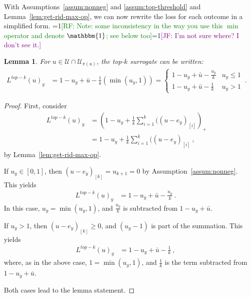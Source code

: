 \documentclass[12pt]{article}
\newcommand{\Comments}{1}
\newcommand{\mynote}[2]{\ifnum\Comments=1\textcolor{#1}{#2}\fi}
\newcommand{\raf}[1]{\mynote{green}{[RF: #1]}}
\newcommand{\jessie}[1]{\mynote{purple}{[JF: #1]}}
\newcommand{\ubar}{\bar{u}}
\newcommand{\U}{\mathcal{U}}
\newcommand{\ones}{\mathbbm{1}}
\newtheorem{lemma}{Lemma}
\begin{document}
With Assumptions~\ref{assum:nonneg} and \ref{assum:top-threshold} and Lemma~\ref{lem:get-rid-max-op}, we can now rewrite the loss for each outcome in a simplified form.
\raf{Note: some inconsistency in the way you use this $\min$ operator and denote $\ones$; see below too}\jessie{I'm not sure where?  I don't see it.}
\begin{lemma}\label{lem:new-form-surrogate}
	For $u \in \U \cap \U_{\pi(u)}$, the top-$k$ surrogate can be written:
\begin{align*} 
L^{top-k}(u)_y  &= 1 - u_y + \bar u - \frac{1}{k}(\min(u_y, 1)) = \begin{cases}
1 - u_y + \bar u - \frac{u_y}{k} & u_y \leq 1\\
1 - u_y + \bar u - \frac{1}{k} & u_y > 1
\end{cases}
~.~
\end{align*}
\end{lemma}
\begin{proof}
	First, consider
\begin{align*}
	L^{top-k}(u)_y &= \left(1 -u_y + \frac{1}{k} \sum_{i=1}^k ((u - e_y)_{[i]} \right)_+\\
	&= 1 -u_y + \frac{1}{k} \sum_{i=1}^k ((u - e_y)_{[i]}~,
	\end{align*}
	by Lemma~\ref{lem:get-rid-max-op}.

	
	If $u_y \in [0,1]$, then $(u-e_y)_{[k]} = u_{k+1} = 0$ by Assumption~\ref{assum:nonneg}.
	This yields
	\begin{align*}
	L^{top-k}(u)_y &= 1 - u_y + \bar u - \frac{u_y}{k}~.~
	\end{align*}
	In this case, $u_y = \min(u_y, 1)$, and $\frac {u_y}{k}$ is subtracted from $1 - u_y + \bar u$.

	If $u_y > 1$, then $(u-e_y)_{[k]} \geq 0$, and $(u_y - 1)$ is part of the summation.
	This yields
	\begin{align*}
	L^{top-k}(u)_y &= 1 - u_y + \bar u - \frac{1}{k}~,~
	\end{align*}
	where, as in the above case, $1 = \min(u_y, 1)$, and $\frac{1}{k}$ is the term subtracted from $1 - u_y + \bar u$.
	
	Both cases lead to the lemma statement.
\end{proof}


%
%
\end{document}
